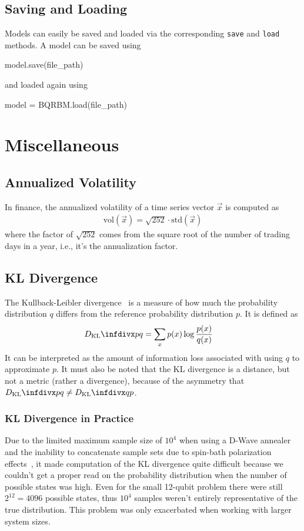 \subsection{Saving and Loading}
Models can easily be saved and loaded via the corresponding \texttt{save} and \texttt{load} methods.
A model can be saved using
\begin{python}
model.save(file_path)
\end{python}
and loaded again using
\begin{python}
model = BQRBM.load(file_path)
\end{python}

\section{Miscellaneous}
\subsection{Annualized Volatility}\label{app:annualized_volatility}
In finance, the annualized volatility of a time series vector \( \vec{x} \) is computed as
\begin{align}
    \text{vol}(\vec{x}) = \sqrt{252} \cdot \text{std}(\vec{x})
\end{align}
where the factor of \( \sqrt{252} \) comes from the square root of the number of trading days in a year, i.e., it's the annualization factor.

\subsection{KL Divergence}\label{app:kl_divergence}
The Kullback-Leibler divergence~\cite{kullback_1951} is a measure of how much the probability distribution \( q \) differs from the reference probability distribution \( p \).
It is defined as
\begin{align}
    \DKL{p}{q}
        &= \sum_{x} p(x) \log\frac{p(x)}{q(x)}
\end{align}
It can be interpreted as the amount of information loss associated with using \( q \) to approximate \( p \).
It must also be noted that the KL divergence is a distance, but not a metric (rather a divergence), because of the asymmetry that \( \DKL{p}{q} \ne \DKL{q}{p} \).

\subsubsection{KL Divergence in Practice}\label{app:kl_divergence_in_practice}
Due to the limited maximum sample size of \( 10^4 \) when using a D-Wave annealer and the inability to concatenate sample sets due to spin-bath polarization effects~\cite{pochart_2021}, it made computation of the KL divergence quite difficult because we couldn't get a proper read on the probability distribution when the number of possible states was high.
Even for the small 12-qubit problem there were still \( 2^{12} = 4096 \) possible states, thus \( 10^4 \) samples weren't entirely representative of the true distribution.
This problem was only exacerbated when working with larger system sizes.

